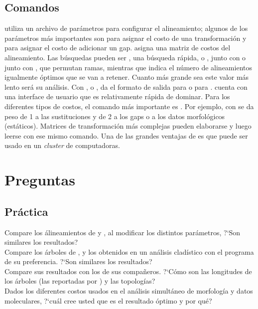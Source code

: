 \subsection{Comandos}
 utiliza un archivo de par\'ametros para configurar el alineamiento; algunos de los par\'ametros m\'as 
importantes son  para asignar el costo de una transformaci\'on y  para asignar el costo de 
adicionar un gap.  asigna una matriz de costos del alineamiento. Las b\'usquedas pueden ser , 
una b\'usqueda r\'apida, o , junto con  o junto con , que permutan ramas, 
mientras que  indica el n\'umero de alineamientos igualmente \'optimos que se van a retener. Cuanto m\'as grande sea este valor m\'as lento ser\'a su an\'alisis. Con , o , da el formato de salida para  o 
para .  cuenta con una interface de usuario que es relativamente r\'apida de dominar. Para los diferentes tipos de costos, el comando m\'as importante es . Por ejemplo, con  se da peso de 1 a las sustituciones y de 2 a los gaps o a los datos morfol\'ogicos (est\'aticos). Matrices de transformaci\'on m\'as complejas pueden elaborarse y luego leerse con ese mismo comando. Una de las grandes ventajas de  es que puede ser usado en un \textit{cluster} de computadoras.\\
\section{Preguntas}
\subsection{Pr\'actica}
\noindent
Compare los \'alineamientos de  y , al modificar los distintos par\'ametros, ?`Son similares los resultados?\\
Compare los \'arboles de ,  y los obtenidos en un an\'alisis clad\'istico con el programa de su  preferencia. ?`Son similares los resultados?\\
Compare sus resultados con los de sus compa\~neros. ?`C\'omo son las longitudes de los \'arboles (las reportadas por ) y las topolog\'ias?\\
Dados los diferentes costos usados en el an\'alisis simult\'aneo de morfolog\'ia y datos moleculares, 
 ?`cu\'al cree usted que es el resultado \'optimo y por qu\'e?
